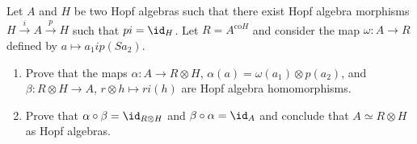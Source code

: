 \documentclass[12pt]{amsproc}
\begin{document}
\begin{exercise}
Let $A$ and $H$ be two Hopf algebras such that there exist Hopf algebra
morphisms $H\xrightarrow{i}A\xrightarrow{p}H$ such that $pi=\id_H$. Let
$R=A^{\mathrm{co}H}$ and consider the map $\omega:A\to R$ defined by $a\mapsto
a_1ip(Sa_2)$. 
\begin{enumerate}
    \item Prove that the maps $\alpha:A\to R\otimes H$, $\alpha(a)=\omega(a_1)\otimes p(a_2)$, and 
    $\beta:R\otimes H\to A$, $r\otimes h\mapsto ri(h)$     
    are Hopf algebra homomorphisms. 
    \item Prove that $\alpha\circ\beta=\id_{R\otimes H}$ and $\beta\circ\alpha=\id_A$ and 
    conclude that $A\simeq R\otimes H$ as Hopf algebras.
\end{enumerate}
\end{exercise}


\newpage 




\printindex
\end{document}
